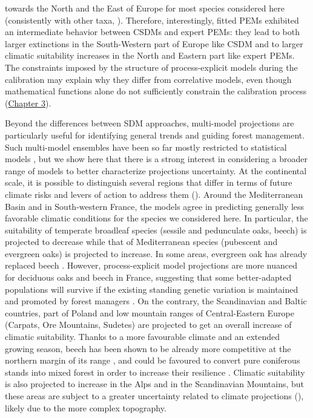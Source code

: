 \documentclass[letterpaper,8pt]{extarticle}  %
\begin{document}
\begin{doublespacing}
\begin{linenumbers}
towards the North and the East of Europe for most species considered here (consistently with other taxa, \citealp{Buckley2010}). Therefore, interestingly, fitted PEMs exhibited an intermediate behavior between CSDMs and expert PEMs: they lead to both larger extinctions in the South-Western part of Europe like CSDM and to larger climatic suitability increases in the North and Eastern part like expert PEMs. The constraints imposed by the structure of process-explicit models during the calibration may explain why they differ from correlative models, even though mathematical functions alone do not suﬀiciently constrain the calibration process (\hyperref[chapter3]{Chapter 3}).

Beyond the differences between SDM approaches, multi-model projections are particularly useful for identifying general trends and guiding forest management. Such multi-model ensembles have been so far mostly restricted to statistical models \citep{Simmonds2024}, but we show here that there is a strong interest in considering a broader range of models to better characterize projections uncertainty. At the continental scale, it is possible to distinguish several regions that differ in terms of future climate risks and levers of action to address them (). Around the Mediterranean Basin and in South-western France, the models agree in predicting generally less favorable climatic conditions for the species we considered here. In particular, the suitability of temperate broadleaf species (sessile and pedunculate oaks, beech) is projected to decrease while that of Mediterranean species (pubescent and evergreen oaks) is projected to increase. In some areas, evergreen oak has already replaced beech \citep{Penuelas2003}. However, process-explicit model projections are more nuanced for deciduous oaks and beech in France, suggesting that some better-adapted populations will survive if the existing standing genetic variation is maintained and promoted by forest managers \citep{Brang2014}. On the contrary, the Scandinavian and Baltic countries, part of Poland and low mountain ranges of Central-Eastern Europe (Carpats, Ore Mountains, Sudetes) are projected to get an overall increase of climatic suitability. Thanks to a more favourable climate and an extended growing season, beech has been shown to be already more competitive at the northern margin of its range \citep{Bolte2010}, and could be favoured to convert pure coniferous stands into mixed forest in order to increase their resilience \citep{Schauer2023}. Climatic suitability is also projected to increase in the Alps and in the Scandinavian Mountains, but these areas are subject to a greater uncertainty related to climate projections (), likely due to the more complex topography. 


\end{linenumbers}
\end{doublespacing}
\end{document}
